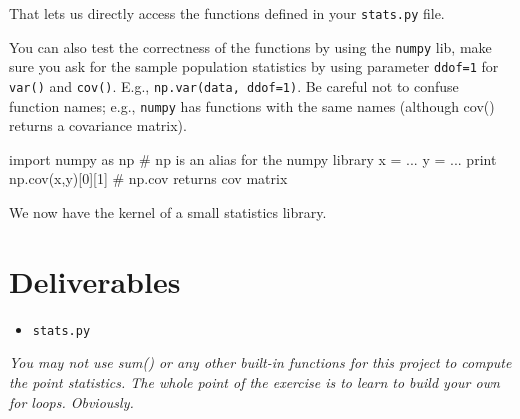 \begin{fullwidth}
\noindent That lets us directly access the functions defined in your {\tt stats.py} file.
 
You can also test the correctness of the functions by using the {\tt numpy} lib, make sure you ask for the sample population statistics by using parameter {\tt ddof=1} for {\tt var()} and {\tt cov()}. E.g., {\tt np.var(data, ddof=1)}. Be careful not to confuse function names; e.g., {\tt numpy} has functions with the same names (although cov() returns a covariance matrix).

\begin{pyverbatim}
import numpy as np  # np is an alias for the numpy library
x = ...
y = ...
print np.cov(x,y)[0][1] # np.cov returns cov matrix
\end{pyverbatim}

We now have the kernel of a small statistics library.

\section{Deliverables}

\begin{itemize}
\item {\tt stats.py}
\end{itemize}

{\em You may not use sum() or any other built-in functions for this project to compute the point statistics.  The whole point of the exercise is to learn to build your own for loops. Obviously.}

\end{fullwidth}

